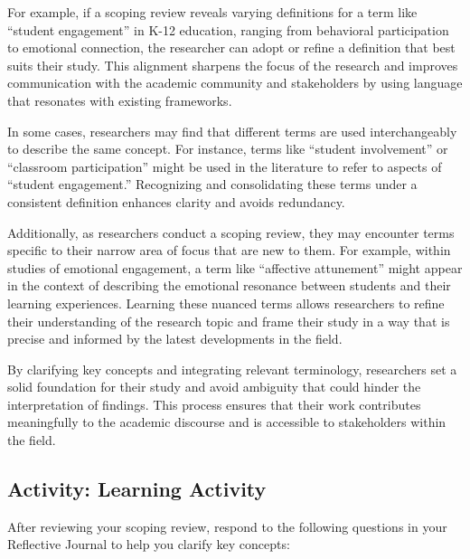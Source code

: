 \documentclass[
  letterpaper,
  DIV=11,
  numbers=noendperiod]{scrreprt}
\begin{document}
For example, if a scoping review reveals varying definitions for a term
like ``student engagement'' in K-12 education, ranging from behavioral
participation to emotional connection, the researcher can adopt or
refine a definition that best suits their study. This alignment sharpens
the focus of the research and improves communication with the academic
community and stakeholders by using language that resonates with
existing frameworks.

In some cases, researchers may find that different terms are used
interchangeably to describe the same concept. For instance, terms like
``student involvement'' or ``classroom participation'' might be used in
the literature to refer to aspects of ``student engagement.''
Recognizing and consolidating these terms under a consistent definition
enhances clarity and avoids redundancy.

Additionally, as researchers conduct a scoping review, they may
encounter terms specific to their narrow area of focus that are new to
them. For example, within studies of emotional engagement, a term like
``affective attunement'' might appear in the context of describing the
emotional resonance between students and their learning experiences.
Learning these nuanced terms allows researchers to refine their
understanding of the research topic and frame their study in a way that
is precise and informed by the latest developments in the field.

By clarifying key concepts and integrating relevant terminology,
researchers set a solid foundation for their study and avoid ambiguity
that could hinder the interpretation of findings. This process ensures
that their work contributes meaningfully to the academic discourse and
is accessible to stakeholders within the field.

\subsection*{Activity: Learning
Activity}\label{activity-learning-activity-8}

After reviewing your scoping review, respond to the following questions
in your Reflective Journal to help you clarify key concepts:
\end{document}
